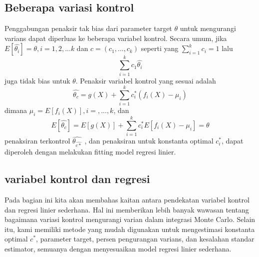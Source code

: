 \documentclass[a4paper,12pt]{article}
\theoremstyle{definition}
\begin{document}
\subsection{Beberapa variasi kontrol}
Penggabungan penaksir tak bias dari parameter target $\theta$ untuk
mengurangi varians dapat diperluas ke beberapa variabel kontrol. Secara umum, jika $E\left [ \widehat{\theta_{i}} \right ]=\theta,i=1,2,...k$ dan $c=\left ( c_{1},...,c_{k} \right )$ seperti yang $\sum_{i=1}^{k}c_{i}=1$ lalu
\begin{equation*}
    \sum_{i=1}^{k}c_{1}\widehat{\theta_{i}}
\end{equation*}
juga tidak bias untuk $\theta$. Penaksir variabel kontrol yang sesuai adalah
\begin{equation*}
    \widehat{\theta_{c}}=g\left ( X \right )+\sum_{i=1}^{k}c^{*}_{i}\left ( f_{i}\left ( X \right ) -\mu _{i}\right )
\end{equation*}
dimana $\mu _{i}=E\left [ f_{i}\left ( X \right ) \right ],i=,...,k$, dan 
\begin{equation*}
    E\left [ \widehat{\theta_{c}} \right ]=E\left [ g\left ( X \right ) \right ]+\sum_{i=1}^{k}c^{*}_{i}E\left [ f_{i}\left ( X \right )-\mu _{i} \right ]=\theta
\end{equation*}
penaksiran terkontrol $\widehat{\theta_{\widehat{c*}}}$ , dan penaksiran untuk konstanta optimal $c^{*}_{i}$, dapat diperoleh dengan melakukan fitting model regresi linier.

\subsection{variabel kontrol dan regresi}
Pada bagian ini kita akan membahas kaitan antara pendekatan variabel kontrol dan regresi linier sederhana. Hal ini memberikan lebih banyak wawasan tentang bagaimana variasi kontrol mengurangi varian dalam integrasi Monte Carlo. Selain itu, kami memiliki metode yang mudah digunakan untuk mengestimasi konstanta optimal $c^{*}$, parameter target, persen pengurangan varians, dan kesalahan standar estimator, semuanya dengan menyesuaikan model regresi linier sederhana.
\end{document}

